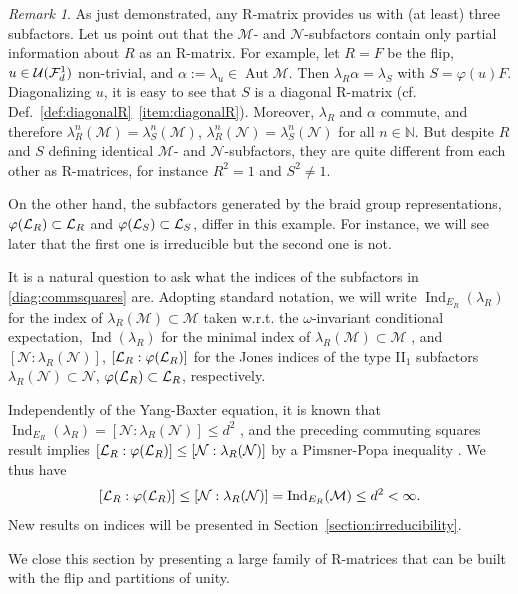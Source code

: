 \documentclass[12pt,a4paper]{amsart}
\numberwithin{equation}{section}
\theoremstyle{remark}
\newtheorem{remark}[theorem]{Remark}
\def\Aut{\operatorname{Aut}}
\def\Ind{\operatorname{Ind}}
\newcommand{\Nl}{\mathbb{N}}
\newcommand{\om}{\omega}
\newcommand{\la}{\lambda}
\newcommand{\CM}[0]{\mathcal{M}} \newcommand{\CN}[0]{\mathcal{N}}
\newcommand{\CU}[0]{\mathcal{U}} \newcommand{\CV}[0]{\mathcal{V}}
\begin{document}
\begin{remark}
	As just demonstrated, any R-matrix provides us with (at least) three subfactors. Let us point out that the $\CM$- and $\CN$-subfactors contain only partial information about $R$ as an R-matrix. For example, let $R=F$ be the flip, $u\in\CU(\CF_d^1)$ non-trivial, and $\alpha:=\la_u\in\Aut\CM$. Then $\la_R\alpha=\la_S$ with $S=\varphi(u)F$. Diagonalizing $u$, it is easy to see that $S$ is a diagonal R-matrix (cf. Def.~\ref{def:diagonalR}~\ref{item:diagonalR}). Moreover, $\la_R$ and $\alpha$ commute, and therefore $\la_R^n(\CM)=\la_S^n(\CM)$, $\la_R^n(\CN)=\la_S^n(\CN)$ for all $n\in\Nl$. But despite $R$ and $S$ defining identical $\CM$- and $\CN$-subfactors, they are quite different from each other as R-matrices, for instance $R^2=1$ and $S^2\neq1$. 

	On the other hand, the subfactors generated by the braid group representations, $\varphi(\mathcal{L}_R)\subset\mathcal{L}_R$ and $\varphi(\mathcal{L}_S)\subset\mathcal{L}_S$, differ in this example. For instance, we will see later that the first one is irreducible but the second one is not.
\end{remark}


It is a natural question to ask what the indices of the subfactors in \eqref{diag:commsquares} are. Adopting standard notation, we will write $\Ind_{E_R}(\la_R)$ for the index of $\la_R(\CM)\subset\CM$ taken w.r.t. the $\om$-invariant conditional expectation, $\Ind(\la_R)$ for the minimal index of $\la_R(\CM)\subset\CM$ \cite{Kosaki:1986,Hiai:1988,Longo:1989}, and $[\CN:\la_R(\CN)]$, $[\mathcal{L}_R:\varphi(\mathcal{L}_R)]$ for the Jones indices \cite{Jones:1983_2} of the type II$_1$ subfactors $\la_R(\CN)\subset\CN$, $\varphi(\mathcal{L}_R)\subset\mathcal{L}_R$, respectively.

Independently of the Yang-Baxter equation, it is known that $\Ind_{E_R}(\la_R)=[\CN:\la_R(\CN)]\leq d^2$ \cite{Longo:1989,ContiPinzari:1996}, and the preceding commuting squares result implies $ [\CL_R:\varphi(\CL_R)]\leq[\CN:\la_R(\CN)]$ by a Pimsner-Popa inequality \cite{PimsnerPopa:1986}. We thus have
\begin{align}\label{eq:basic-index-bounds}
	[\CL_R:\varphi(\CL_R)]
	\leq 
	[\CN:\la_R(\CN)] 
	= 
	\Ind_{E_R}(\CM) 
	\leq 
	d^2
	<\infty.
\end{align}
New results on indices will be presented in Section~\ref{section:irreducibility}.


\medskip

We close this section by presenting a large family of R-matrices that can be built with the flip and partitions of unity. 
\end{document}
